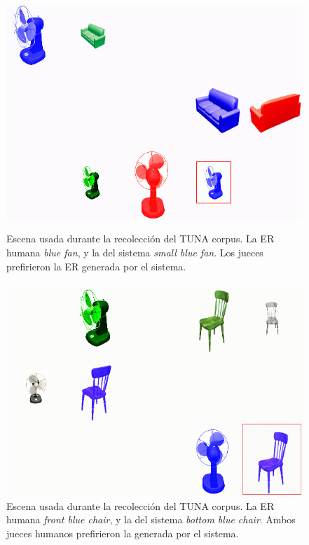 \begin{figure}[h]
\begin{minipage}{0.48\linewidth}
\centering
\includegraphics[width=\textwidth]{images/smallBlueFan.jpg}
\caption{Escena usada durante la recolecci\'on del TUNA corpus. La ER humana \emph{blue fan}, y la del sistema \emph{small blue fan}. Los jueces prefirieron la ER generada por el sistema.}
\label{smallBlueFan}
\end{minipage}
\hspace*{.04cm}
\begin{minipage}{0.48\linewidth}
\centering
\vspace*{.4cm}
\includegraphics[width=\textwidth]{images/tuna.jpg} 
\vspace*{-.4cm}
\caption{Escena usada durante la recolecci\'on del TUNA corpus. La ER humana \emph{front blue chair}, y la del sistema \emph{bottom blue chair}. Ambos jueces humanos prefirieron la generada por el sistema.}
\label{BlueChair}
\end{minipage}
\end{figure}

